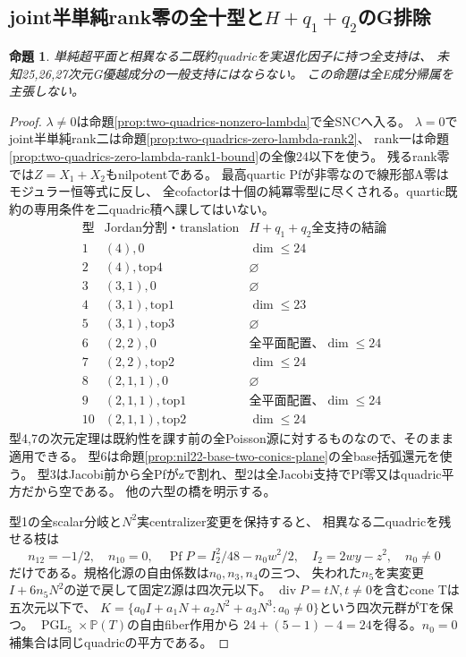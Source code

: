 \documentclass[a4paper,11pt]{ltjsarticle}
\newtheorem{proposition}{命題}[section]
\theoremstyle{definition}
\newcommand{\PGL}{\operatorname{PGL}}
\begin{document}
\subsection{joint半単純rank零の全十型と$H+q_1+q_2$のG排除}
\begin{proposition}\label{prop:two-quadrics-all-G}
単純超平面と相異なる二既約quadricを実退化因子に持つ全支持は、
未知25,26,27次元G優越成分の一般支持にはならない。
この命題は全E成分帰属を主張しない。
\end{proposition}
\begin{proof}
$\lambda\ne0$は命題\ref{prop:two-quadrics-nonzero-lambda}で全SNCへ入る。
$\lambda=0$でjoint半単純rank二は命題\ref{prop:two-quadrics-zero-lambda-rank2}、
rank一は命題\ref{prop:two-quadrics-zero-lambda-rank1-bound}の全像24以下を使う。
残るrank零では$Z=X_1+X_2$もnilpotentである。
最高quartic Pfが非零なので線形部A零はモジュラー恒等式に反し、
全cofactorは十個の純冪零型に尽くされる。quartic既約の専用条件を二quadric積へ課してはいない。
\[
\begin{array}{c|c|c}
 \text{型}&\text{Jordan分割・translation}&H+q_1+q_2\text{全支持の結論}\\\hline
 1&(4),0&\dim\le24\\
 2&(4),\mathrm{top}4&\varnothing\\
 3&(3,1),0&\varnothing\\
 4&(3,1),\mathrm{top}1&\dim\le23\\
 5&(3,1),\mathrm{top}3&\varnothing\\
 6&(2,2),0&\text{全平面配置、}\dim\le24\\
 7&(2,2),\mathrm{top}2&\dim\le24\\
 8&(2,1,1),0&\varnothing\\
 9&(2,1,1),\mathrm{top}1&\text{全平面配置、}\dim\le24\\
 10&(2,1,1),\mathrm{top}2&\dim\le24
\end{array}
\]
型4,7の次元定理は既約性を課す前の全Poisson源に対するものなので、そのまま適用できる。
型6は命題\ref{prop:nil22-base-two-conics-plane}の全base括弧還元を使う。
型3はJacobi前から全Pfがzで割れ、型2は全Jacobi支持でPf零又はquadric平方だから空である。
他の六型の橋を明示する。

型1の全scalar分岐と$N^2$実centralizer変更を保持すると、
相異なる二quadricを残せる枝は
\[
 n_{12}=-1/2,\quad n_{10}=0,\quad
 \operatorname{Pf}P=I_2^2/48-n_0w^2/2,\quad I_2=2wy-z^2,\quad n_0\ne0
\]
だけである。規格化源の自由係数は$n_0,n_3,n_4$の三つ、
失われた$n_5$を実変更$I+6n_5N^2$の逆で戻して固定Z源は四次元以下。
$\operatorname{div}P=tN,t\ne0$を含むcone Tは五次元以下で、
$K=\{a_0I+a_1N+a_2N^2+a_3N^3:a_0\ne0\}$という四次元群がTを保つ。
$\PGL_5\times\mathbb P(T)$の自由fiber作用から
$24+(5-1)-4=24$を得る。$n_0=0$補集合は同じquadricの平方である。


\end{proof}
\end{document}
